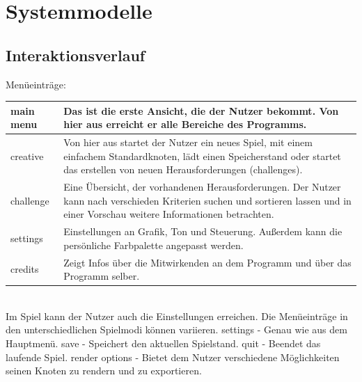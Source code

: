 \chapter{Systemmodelle}


\section{Interaktionsverlauf}

Menüeinträge:

\begin{longtable}{|p{}|p{}|}
    \hline
    main menu & Das ist die erste Ansicht, die der Nutzer bekommt. Von hier aus erreicht er alle Bereiche des Programms.\\
    
    \hline
    
    creative & Von hier aus startet der Nutzer ein neues Spiel, mit einem einfachem Standardknoten, lädt einen Speicherstand oder startet das erstellen von neuen Herausforderungen (challenges).\\
    
    \hline
    
    challenge & Eine Übersicht, der vorhandenen Herausforderungen. Der Nutzer kann nach verschieden Kriterien suchen und sortieren lassen und in einer Vorschau weitere Informationen betrachten.\\

    \hline
    
    settings & Einstellungen an Grafik, Ton und Steuerung. Außerdem kann die persönliche Farbpalette angepasst werden.\\

    \hline
    
    credits & Zeigt Infos über die Mitwirkenden an dem Programm und über das Programm selber.\\

    \hline
    
   \end{longtable}
    
%	  
	~\\
	Im Spiel kann der Nutzer auch die {\color{red} Einstellungen} erreichen. Die Menüeinträge in den unterschiedlichen Spielmodi können variieren.
	settings - Genau wie aus dem Hauptmenü.
	save - Speichert den aktuellen Spielstand.
	quit - Beendet das laufende Spiel.
	render options - Bietet dem Nutzer verschiedene Möglichkeiten seinen Knoten zu rendern und zu exportieren.
	
